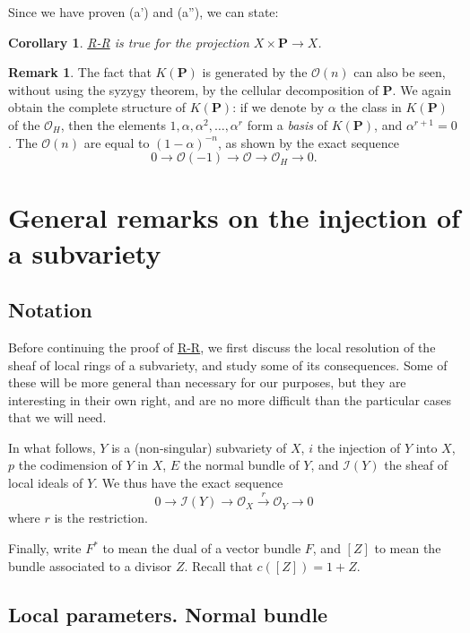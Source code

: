 \documentclass{article}
\theoremstyle{plain}
\newtheorem*{corollary}{Corollary}
\theoremstyle{definition}
\newtheorem*{remark}{Remark}
\newcommand{\sh}{\mathscr}
\newcommand{\PP}{\mathbf{P}}
\newcommand{\oldpage}[1]{\marginpar{\footnotesize$\Big\vert$ \textit{p.~#1}}}
\begin{document}
Since we have proven (a') and (a''), we can state:

\begin{corollary}
  \hyperref[theoremriemannroch]{R-R} is true for the projection $X\times\PP\to X$.
\end{corollary}

\begin{remark}
  The fact that $K(\PP)$ is generated by the $\sh{O}(n)$ can also be seen, without using the syzygy theorem, by the cellular decomposition of $\PP$.
  We again obtain the complete structure of $K(\PP)$:
  if we denote by $\alpha$ the class in $K(\PP)$ of the $\sh{O}_H$, then the elements $1,\alpha,\alpha^2,\ldots,\alpha^r$ form a \emph{basis} of $K(\PP)$, and $\alpha^{r+1}=0$.
  The $\sh{O}(n)$ are equal to $(1-\alpha)^{-n}$, as shown by the exact sequence
  \[
    0 \to \sh{O}(-1) \to \sh{O} \to \sh{O}_H \to 0.
  \]
\end{remark}


\section{General remarks on the injection of a subvariety}
\label{section10}


\subsection{Notation}
\label{subsection10a}

\oldpage{120}
Before continuing the proof of \hyperref[theoremriemannroch]{R-R}, we first discuss the local resolution of the sheaf of local rings of a subvariety, and study some of its consequences.
Some of these will be more general than necessary for our purposes, but they are interesting in their own right, and are no more difficult than the particular cases that we will need.

In what follows, $Y$ is a (non-singular) subvariety of $X$, $i$ the injection of $Y$ into $X$, $p$ the codimension of $Y$ in $X$, $E$ the normal bundle of $Y$, and $\sh{I}(Y)$ the sheaf of local ideals of $Y$.
We thus have the exact sequence
\[
\label{section10aequation1}
  0 \to \sh{I}(Y) \to \sh{O}_X \xrightarrow{r} \sh{O}_Y \to 0
  \tag{1}
\]
where $r$ is the restriction.

Finally, write $F^*$ to mean the dual of a vector bundle $F$, and $[Z]$ to mean the bundle associated to a divisor $Z$.
Recall that $c([Z])=1+Z$.


\subsection{Local parameters. Normal bundle}
\label{subsection10b}
\end{document}
